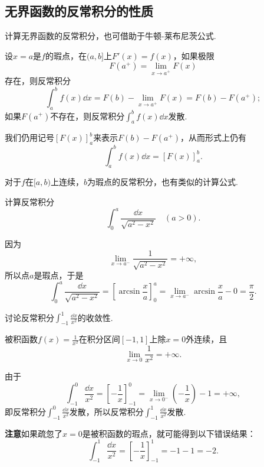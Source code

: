 \subsection{无界函数的反常积分的性质}
计算无界函数的反常积分，也可借助于牛顿-莱布尼茨公式.
\begin{theorem}\label{theorem:定积分.利用牛顿莱布尼茨公式计算无界函数的反常积分}
设\(x=a\)是\(f\)的瑕点，在\((a,b]\)上\(F'(x) = f(x)\)，如果极限\[
F(a^+) = \lim\limits_{x \to a^+} F(x)
\]存在，则反常积分\[
\int_a^b f(x) \dd{x}
= F(b) - \lim\limits_{x \to a^+} F(x)
= F(b) - F(a^+);
\]如果\(F(a^+)\)不存在，则反常积分\(\int_a^b f(x) \dd{x}\)发散.

我们仍用记号\([F(x)]_a^b\)来表示\(F(b) - F(a^+)\)，从而形式上仍有\[
\int_a^b f(x) \dd{x} = [F(x)]_a^b.
\]
\end{theorem}
对于\(f\)在\([a,b)\)上连续，\(b\)为瑕点的反常积分，也有类似的计算公式.

\begin{example}
计算反常积分\[
\int_0^a \frac{\dd{x}}{\sqrt{a^2-x^2}}\quad(a>0).
\]
\begin{solution}
因为\[
\lim\limits_{x \to a^-} \frac{1}{\sqrt{a^2-x^2}} = +\infty,
\]所以点\(a\)是瑕点，于是\[
\int_0^a \frac{\dd{x}}{\sqrt{a^2-x^2}}
= \left[ \arcsin\frac{x}{a} \right]_0^a
= \lim\limits_{x \to a^-} \arcsin\frac{x}{a} - 0 = \frac{\pi}{2}.
\]
\end{solution}
\end{example}

\begin{example}
讨论反常积分\(\int_{-1}^1 \frac{\dd{x}}{x^2}\)的收敛性.
\begin{solution}
被积函数\(f(x) = \frac{1}{x^2}\)在积分区间\([-1,1]\)上除\(x=0\)外连续，且\[
\lim\limits_{x\to0} \frac{1}{x^2} = +\infty.
\]

由于\[
\int_{-1}^0 \frac{\dd{x}}{x^2}
= \left[-\frac{1}{x}\right]_{-1}^0
= \lim\limits_{x\to0^-} \left(-\frac{1}{x}\right) - 1
= +\infty,
\]即反常积分\(\int_{-1}^0 \frac{\dd{x}}{x^2}\)发散，所以反常积分\(\int_{-1}^1 \frac{\dd{x}}{x^2}\)发散.
\end{solution}

\textbf{注意}\hspace{1em}如果疏忽了\(x=0\)是被积函数的瑕点，就可能得到以下错误结果：\[
\int_{-1}^1 \frac{\dd{x}}{x^2}
= \left[ -\frac{1}{x} \right]_{-1}^1
= -1 - 1 = -2.
\]
\end{example}

